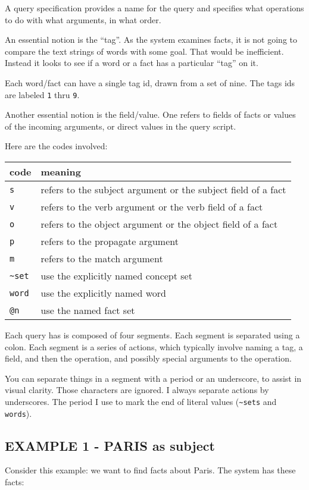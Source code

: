 \documentclass[]{article}
\begin{document}
A query specification provides a name for the query and specifies what
operations to do with what arguments, in what order.

An essential notion is the ``tag''. As the system examines facts, it is
not going to compare the text strings of words with some goal. That
would be inefficient. Instead it looks to see if a word or a fact has a
particular ``tag'' on it.

Each word/fact can have a single tag id, drawn from a set of nine. The
tags ids are labeled \texttt{1} thru \texttt{9}.

Another essential notion is the field/value. One refers to fields of
facts or values of the incoming arguments, or direct values in the query
script.

Here are the codes involved:

\begin{longtable}[]{@{}ll@{}}
\toprule
code & meaning\tabularnewline
\midrule
\endhead
\texttt{s} & refers to the subject argument or the subject field of a
fact\tabularnewline
\texttt{v} & refers to the verb argument or the verb field of a
fact\tabularnewline
\texttt{o} & refers to the object argument or the object field of a
fact\tabularnewline
\texttt{p} & refers to the propagate argument\tabularnewline
\texttt{m} & refers to the match argument\tabularnewline
\texttt{\textasciitilde{}set} & use the explicitly named concept
set\tabularnewline
\texttt{\textquotesingle{}word} & use the explicitly named
word\tabularnewline
\texttt{@n} & use the named fact set\tabularnewline
\bottomrule
\end{longtable}

Each query has is composed of four segments. Each segment is separated
using a colon. Each segment is a series of actions, which typically
involve naming a tag, a field, and then the operation, and possibly
special arguments to the operation.

You can separate things in a segment with a period or an underscore, to
assist in visual clarity. Those characters are ignored. I always
separate actions by underscores. The period I use to mark the end of
literal values (\texttt{\textasciitilde{}sets} and
\texttt{\textquotesingle{}words}).

\subsection{EXAMPLE 1 - PARIS as
subject}\label{example-1---paris-as-subject}

Consider this example: we want to find facts about Paris. The system has
these facts:
\end{document}
